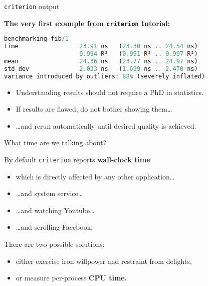 \documentclass[handout]{beamer}
\begin{document}
\begin{frame}[fragile]{{\tt criterion} output}

\centerline{\bf The very first example from {\tt criterion} tutorial:}

\begin{lstlisting}[language=Haskell]
benchmarking fib/1
time                 23.91 ns   (23.30 ns .. 24.54 ns)
                     0.994 R²   (0.991 R² .. 0.997 R²)
mean                 24.36 ns   (23.77 ns .. 24.97 ns)
std dev              2.033 ns   (1.699 ns .. 2.470 ns)
variance introduced by outliers: 88% (severely inflated)
\end{lstlisting}

\pause

\bigskip

\begin{itemize}[<+->]
\item Understanding results should not require a PhD in statistics.
\item If results are flawed, do not bother showing them\dots
\item \dots and rerun automatically until desired quality is achieved.
\end{itemize}

\end{frame}

\begin{frame}[fragile]{What time are we talking about?}

By default {\tt criterion} reports {\bf wall-clock time}

\begin{itemize}[<+->]
\item which is directly affected by any other application\dots
\item \dots and system service\dots
\item \dots and watching Youtube\dots
\item \dots and scrolling Facebook.
\end{itemize}

\pause\bigskip

There are two possible solutions:

\begin{itemize}[<+->]
\item either exercise iron willpower and restraint from delights,
\item or measure per-process {\bf CPU time.}
\end{itemize}

\end{frame}
\end{document}
